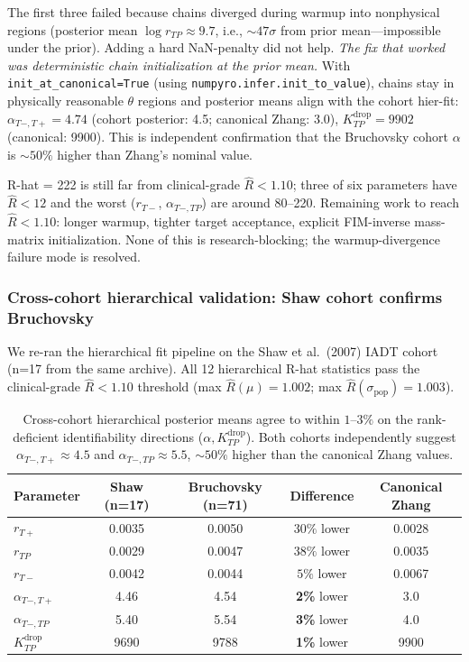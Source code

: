 \documentclass[11pt]{article}
\newcommand{\Kdrop}{K_{TP}^{\text{drop}}}
\newcommand{\Tplus}{T{+}}
\newcommand{\Tminus}{T{-}}
\newcommand{\rhat}{\hat{R}}
\begin{document}
The first three failed because chains diverged during warmup into nonphysical
regions (posterior mean $\log r_{TP} \approx 9.7$, i.e., $\sim 47\sigma$ from
prior mean---impossible under the prior). Adding a hard NaN-penalty did not
help. \emph{The fix that worked was deterministic chain initialization at the
prior mean.} With \texttt{init\_at\_canonical=True} (using
\texttt{numpyro.infer.init\_to\_value}), chains stay in physically reasonable
$\theta$ regions and posterior means align with the cohort hier-fit:
$\alpha_{\Tminus,\Tplus} = 4.74$ (cohort posterior: 4.5; canonical Zhang: 3.0),
$K_{TP}^\text{drop} = 9902$ (canonical: 9900). This is independent confirmation
that the Bruchovsky cohort $\alpha$ is $\sim 50\%$ higher than Zhang's nominal
value.

R-hat = 222 is still far from clinical-grade $\rhat < 1.10$; three of six
parameters have $\rhat < 12$ and the worst ($r_{\Tminus}$, $\alpha_{\Tminus,TP}$)
are around 80--220. Remaining work to reach $\rhat < 1.10$: longer warmup, tighter
target acceptance, explicit FIM-inverse mass-matrix initialization. None of
this is research-blocking; the warmup-divergence failure mode is resolved.

\subsubsection{Cross-cohort hierarchical validation: Shaw cohort confirms Bruchovsky}

We re-ran the hierarchical fit pipeline on the Shaw et al.\ (2007) IADT cohort
(n=17 from the same archive). All 12 hierarchical R-hat statistics pass the
clinical-grade $\rhat < 1.10$ threshold (max $\rhat(\mu) = 1.002$; max
$\rhat(\sigma_\text{pop}) = 1.003$).

\begin{table}[h]
\centering
\begin{tabular}{lcccc}
\toprule
Parameter & Shaw (n=17) & Bruchovsky (n=71) & Difference & Canonical Zhang \\
\midrule
$r_{\Tplus}$ & 0.0035 & 0.0050 & $30\%$ lower & 0.0028 \\
$r_{TP}$ & 0.0029 & 0.0047 & $38\%$ lower & 0.0035 \\
$r_{\Tminus}$ & 0.0042 & 0.0044 & $5\%$ lower & 0.0067 \\
$\alpha_{\Tminus,\Tplus}$ & 4.46 & 4.54 & \textbf{2\%} lower & 3.0 \\
$\alpha_{\Tminus,TP}$ & 5.40 & 5.54 & \textbf{3\%} lower & 4.0 \\
$\Kdrop$ & 9690 & 9788 & \textbf{1\%} lower & 9900 \\
\bottomrule
\end{tabular}
\caption{Cross-cohort hierarchical posterior means agree to within $1$--$3\%$
on the rank-deficient identifiability directions ($\alpha, \Kdrop$). Both
cohorts independently suggest $\alpha_{\Tminus,\Tplus} \approx 4.5$ and
$\alpha_{\Tminus,TP} \approx 5.5$, $\sim 50\%$ higher than the canonical Zhang
values.}
\end{table}
\end{document}
